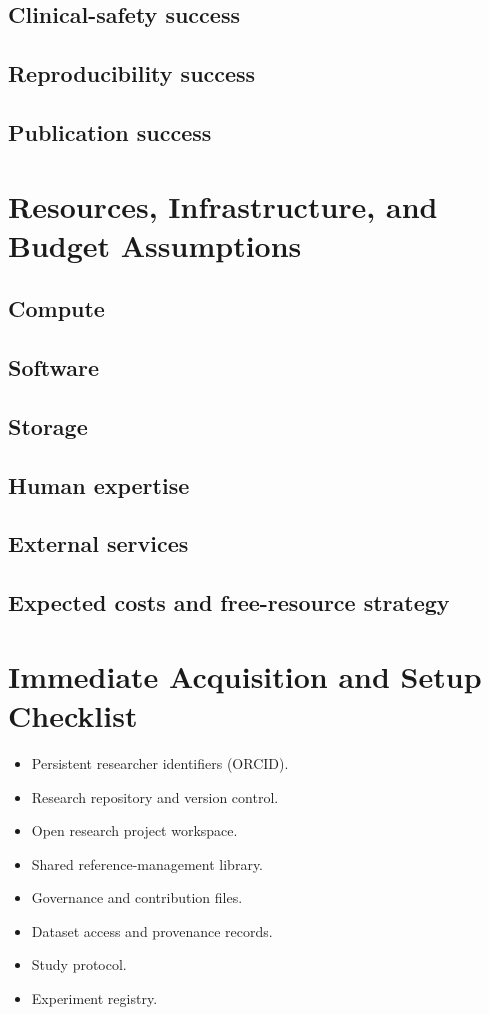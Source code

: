 \documentclass[11pt,journal,onecolumn,draftclsnofoot]{IEEEtran}
\begin{document}
\subsection{Clinical-safety success}
\subsection{Reproducibility success}
\subsection{Publication success}

\section{Resources, Infrastructure, and Budget Assumptions}
\subsection{Compute}
\subsection{Software}
\subsection{Storage}
\subsection{Human expertise}
\subsection{External services}
\subsection{Expected costs and free-resource strategy}

\section{Immediate Acquisition and Setup Checklist}
\begin{itemize}
    \item Persistent researcher identifiers (ORCID).
    \item Research repository and version control.
    \item Open research project workspace.
    \item Shared reference-management library.
    \item Governance and contribution files.
    \item Dataset access and provenance records.
    \item Study protocol.
    \item Experiment registry.
\end{itemize}
\end{document}
